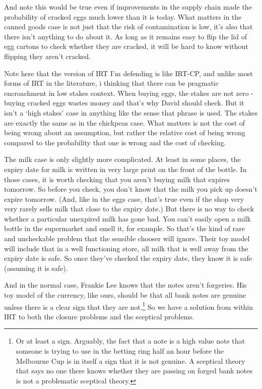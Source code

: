 \documentclass[
  12pt,
]{article}
\begin{document}
And note this would be true even if improvements in the supply chain made the probability of cracked eggs much lower than it is today. What matters in the canned goods case is not just that the risk of contamination is low, it's also that there isn't anything to do about it. As long as it remains easy to flip the lid of egg cartons to check whether they are cracked, it will be hard to know without flipping they aren't cracked.

Note here that the version of IRT I'm defending is like IRT-CP, and unlike most forms of IRT in the literature, i thinking that there can be pragmatic encroachment in low stakes context. When buying eggs, the stakes are not zero - buying cracked eggs wastes money and that's why David should check. But it isn't a `high stakes' case in anything like the sense that phrase is used. The stakes are exactly the same as in the chickpeas case. What matters is not the cost of being wrong about an assumption, but rather the relative cost of being wrong compared to the probability that one is wrong and the cost of checking.

The milk case is only slightly more complicated. At least in some places, the expiry date for milk is written in very large print on the front of the bottle. In those cases, it is worth checking that you aren't buying milk that expires tomorrow. So before you check, you don't know that the milk you pick up doesn't expire tomorrow. (And, like in the eggs case, that's true even if the shop very very rarely sells milk that close to the expiry date.) But there is no way to check whether a particular unexpired milk has gone bad. You can't easily open a milk bottle in the supermarket and smell it, for example. So that's the kind of rare and uncheckable problem that the sensible chooser will ignore. Their toy model will include that in a well functioning store, all milk that is well away from the expiry date is safe. So once they've checked the expiry date, they know it is safe (assuming it is safe).

And in the normal case, Frankie Lee knows that the notes aren't forgeries. His toy model of the currency, like ours, should be that all bank notes are genuine unless there is a clear sign that they are not.\footnote{Or at least a sign. Arguably, the fact that a note is a high value note that someone is trying to use in the betting ring half an hour before the Melbourne Cup is in itself a sign that it is not genuine. A sceptical theory that says no one there knows whether they are passing on forged bank notes is not a problematic sceptical theory.} So we have a solution from within IRT to both the closure problems and the sceptical problems.
\end{document}
